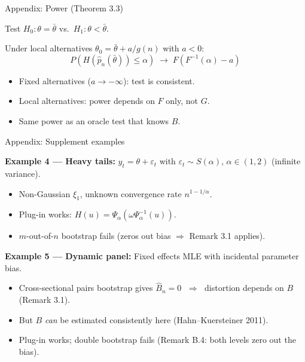 \documentclass[10pt,aspectratio=169]{beamer}
\theoremstyle{plain}
\newcommand{\Bnh}{\hat{B}_{n}}
\newcommand{\pnh}{\hat{p}_{n}}
\begin{document}
\begin{frame}[noframenumbering]{Appendix: Power (Theorem 3.3)}

  Test $H_0: \theta = \bar\theta$ vs.\ $H_1: \theta < \bar\theta$.

  \medskip

  Under local alternatives $\theta_0 = \bar\theta + a/g(n)$ with $a < 0$:
  \[
    P(H(\pnh(\bar\theta)) \le \alpha) \;\to\; F(F^{-1}(\alpha) - a)
  \]

  \begin{itemize}
    \item Fixed alternatives ($a \to -\infty$): test is consistent.
    \item Local alternatives: power depends on $F$ only, not $G$.
    \item Same power as an oracle test that knows $B$.
  \end{itemize}

\end{frame}

\begin{frame}[noframenumbering]{Appendix: Supplement examples}

  \textbf{Example 4 --- Heavy tails:} $y_t = \theta + \varepsilon_t$ with
  $\varepsilon_t \sim S(\alpha)$, $\alpha \in (1,2)$ (infinite variance).
  \begin{itemize}
    \item Non-Gaussian $\xi_1$, unknown convergence rate $n^{1-1/\alpha}$.
    \item Plug-in works: $H(u) = \Psi_\alpha(\omega\Psi_\alpha^{-1}(u))$.
    \item $m$-out-of-$n$ bootstrap fails (zeros out bias $\Rightarrow$ Remark 3.1 applies).
  \end{itemize}

  \bigskip

  \textbf{Example 5 --- Dynamic panel:} Fixed effects MLE with incidental parameter bias.
  \begin{itemize}
    \item Cross-sectional pairs bootstrap gives $\Bnh = 0$
      $\;\Rightarrow\;$ distortion depends on $B$ (Remark 3.1).
    \item But $B$ \textit{can} be estimated consistently here (Hahn--Kuersteiner 2011).
    \item Plug-in works; \alert{double bootstrap fails}
      (Remark B.4: both levels zero out the bias).
  \end{itemize}

\end{frame}
\end{document}
